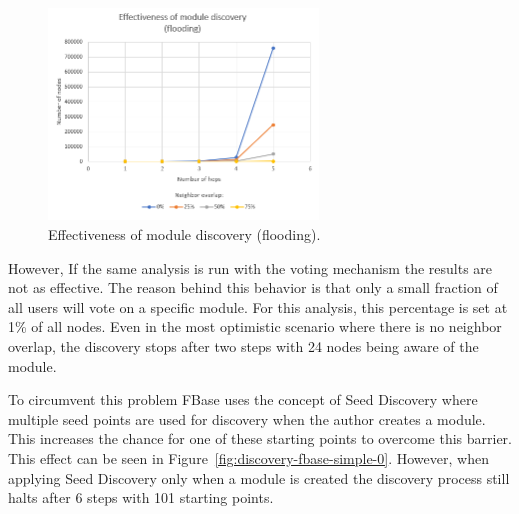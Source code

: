 \begin{figure}[ht!]
	\centering
	\includegraphics[width=0.64\textwidth]{images/discovery-flooding.png}
	\caption{\label{fig:discovery-flooding} Effectiveness of module discovery (flooding).}
\end{figure}

\newpage

However, If the same analysis is run with the voting mechanism the results are not as effective. The reason behind this behavior is that only a small fraction of all users will vote on a specific module. For this analysis, this percentage is set at 1\% of all nodes. Even in the most optimistic scenario where there is no neighbor overlap, the discovery stops after two steps with 24 nodes being aware of the module.

To circumvent this problem FBase uses the concept of Seed Discovery where multiple seed points are used for discovery when the author creates a module. This increases the chance for one of these starting points to overcome this barrier. This effect can be seen in Figure~\ref{fig:discovery-fbase-simple-0}. However, when applying Seed Discovery only when a module is created the discovery process still halts after 6 steps with 101 starting points.

